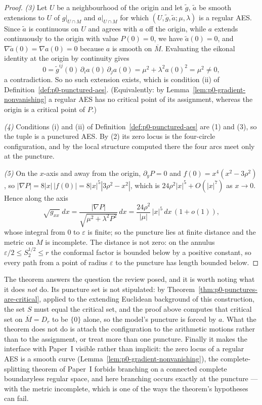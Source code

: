 \begin{proof}
\emph{(3)} Let $U$ be a neighbourhood of the origin and let $\widetilde g$,
$\widetilde a$ be smooth extensions to $U$ of $g|_{U\cap M}$ and $a|_{U\cap M}$
for which $(U,\widetilde g,\widetilde a;\mu,\lambda)$ is a regular AES.  Since
$\widetilde a$ is continuous on $U$ and agrees with $a$ off the origin, while $a$
extends continuously to the origin with value $P(0)=0$, we have
$\widetilde a(0)=0$, and $\nabla\widetilde a(0)=\nabla a(0)=0$ because $a$ is
smooth on $\overline M$.  Evaluating the eikonal identity at the origin by
continuity gives
\[
  0=\widetilde g^{ij}(0)\,\partial_i a(0)\,\partial_j a(0)
   =\mu^2+\lambda^2a(0)^2=\mu^2\ne0 ,
\]
a contradiction.  So no such extension exists, which is condition (ii) of
Definition~\ref{def:p0-punctured-aes}.  (Equivalently: by
Lemma~\ref{lem:p0-gradient-nonvanishing} a regular AES has no critical point of
its assignment, whereas the origin is a critical point of $P$.)

\emph{(4)} Conditions (i) and (ii) of Definition~\ref{def:p0-punctured-aes} are
(1) and (3), so the tuple is a punctured AES.  By (2) its zero locus is the
four-circle configuration, and by the local structure computed there the four
arcs meet only at the puncture.

\emph{(5)} On the $x$-axis and away from the origin, $\partial_yP=0$ and
$f(0)=x^4(x^2-3\rho^2)$, so $|\nabla P|=8|x|\,|f(0)|=8|x|^5|3\rho^2-x^2|$, which
is $24\rho^2|x|^5+O(|x|^7)$ as $x\to0$.  Hence along the axis
\[
  \sqrt{g_{xx}}\;dx
  =\frac{|\nabla P|}{\sqrt{\mu^2+\lambda^2P^2}}\,dx
  =\frac{24\rho^2}{|\mu|}\,|x|^5\,dx\,(1+o(1)),
\]
whose integral from $0$ to $\varepsilon$ is finite; so the puncture lies at
finite distance and the metric on $M$ is incomplete.  The distance is not zero:
on the annulus $\varepsilon/2\le S_2^{1/2}\le r$ the conformal factor is bounded
below by a positive constant, so every path from a point of radius $\varepsilon$
to the puncture has length bounded below.
\end{proof}

The theorem answers the question the review posed, and it is worth noting what it
does \emph{not} do.  Its puncture set is not stipulated: by
Theorem~\ref{thm:p0-punctures-are-critical}, applied to the extending Euclidean
background of this construction, the set $S$ must equal the critical set, and the proof above computes that critical set on
$\overline M=D_r$ to be $\{0\}$ alone, so the model's puncture is forced by $a$.
What the theorem does not do is attach the
configuration to the arithmetic motions rather than to the assignment, or treat
more than one puncture.  Finally it makes the interface with
Paper~I visible rather than implicit: the zero locus of a regular AES is a smooth
curve (Lemma~\ref{lem:p0-gradient-nonvanishing}), the complete-splitting theorem
of Paper~I forbids branching on a connected complete boundaryless regular space,
and here branching occurs exactly at the puncture --- with the metric incomplete,
which is one of the ways the theorem's hypotheses can fail.

